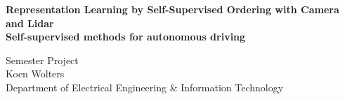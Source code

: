 %

\begin{titlepage}

\thispagestyle{empty}




\vspace*{2cm}
\begin{center}
\huge{\textbf{Representation Learning by Self-Supervised Ordering with Camera and Lidar}\\}
\vspace*{3mm}
\Large{\textbf{Self-supervised methods for autonomous driving}\\[1cm]}

\large{Semester Project\\[0.8cm]}
\LARGE{Koen Wolters\\}
\normalsize{Department of Electrical Engineering \& Information Technology}
\end{center}

\begin{center}
 



\end{center}
\end{titlepage}

